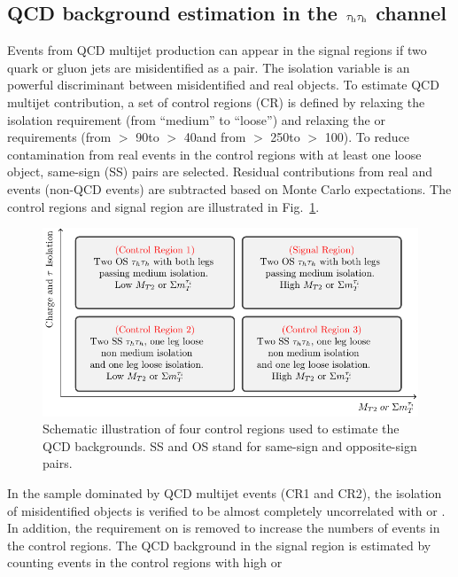 \subsection{\texorpdfstring{QCD background estimation in the $\tau_{\rm h}\tau_{\rm h}$ channel}{QCD background estimation in the tau-tau channel}}
\label{sect:bkgQCD}
Events from QCD multijet production can appear in the signal regions 
if two quark or gluon jets are misidentified as a \tauTau pair.
The isolation variable is an powerful 
discriminant between misidentified and real \Tau objects. To estimate QCD multijet contribution, a set of \tauTau control regions (CR) is defined 
by relaxing the \Tau isolation requirement (from ``medium'' to ``loose'') 
and relaxing the \mttwo or \SumMT requirements (from \mttwo $>$ 90\GeV to \mttwo $>$ 40\GeV and from \SumMT $>$ 250\GeV to \SumMT $>$ 100\GeV). 
To reduce contamination from real \tauTau events 
in the control regions with at least one loose \Tau object, 
same-sign (SS) \tauTau pairs are selected. Residual contributions from real 
\tauTau and \wjets events (non-QCD events) are subtracted based on Monte Carlo expectations. 
The control regions and signal region are 
illustrated in Fig.~\ref{fig:ABCDQCD}. 
\begin{figure}[!htb]
\centering
\includegraphics[angle=0,scale=1.15]{Bkg/ABCD.pdf}
\caption{Schematic illustration of four control regions used to estimate the QCD backgrounds. SS and OS stand for same-sign and opposite-sign pairs.}
\label{fig:ABCDQCD}
\end{figure}
In the sample dominated by QCD multijet events (CR1 and CR2), the isolation of misidentified \Tau objects is verified 
to be almost completely uncorrelated with \mttwo or \SumMT.
In addition, the requirement on \deltaphi
is removed to increase the numbers of events in the control regions. 
The QCD background in the signal region is estimated by counting events in the control regions with high \mttwo or \SumMT  
